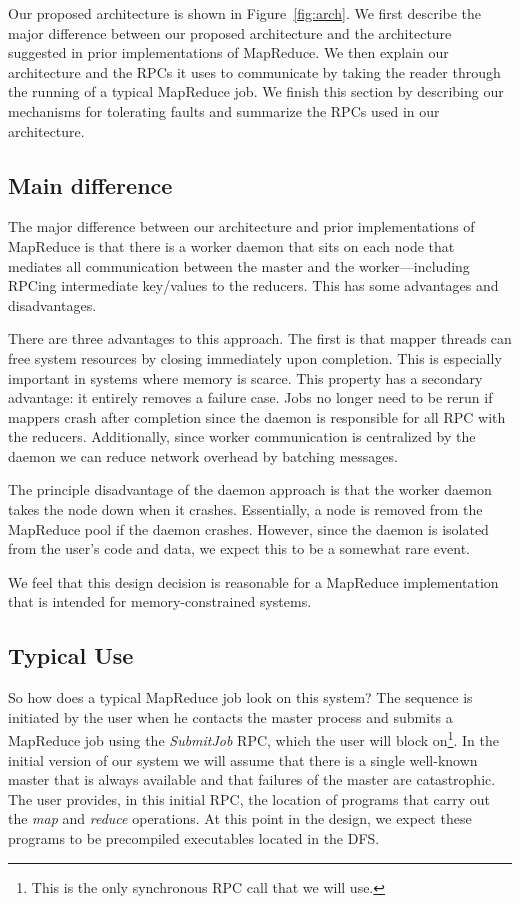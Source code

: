 \documentclass[10pt,letter,final,article,twocolumn]{article} %
\newcommand{\rpc}[1]{\emph{#1}}
\begin{document}
Our proposed architecture is shown in Figure~\ref{fig:arch}. We first describe the major difference between our proposed architecture and the architecture suggested in prior implementations of MapReduce. We then explain our architecture and the RPCs it uses to communicate by taking the reader through the running of a typical MapReduce job. We finish this section by describing our mechanisms for tolerating faults and summarize the RPCs used in our architecture.

\subsection{Main difference}

The major difference between our architecture and prior implementations of MapReduce is that there is a worker daemon that sits on each node that mediates all communication between the master and the worker---including RPCing intermediate key/values to the reducers. This has some advantages and disadvantages.

There are three advantages to this approach. The first is that mapper threads can free system resources by closing immediately upon completion. This is especially important in systems where memory is scarce. This property has a secondary advantage: it entirely removes a failure case. Jobs no longer need to be rerun if mappers crash after completion since the daemon is responsible for all RPC with the reducers. Additionally, since worker communication is centralized by the daemon we can reduce network overhead by batching messages.

The principle disadvantage of the daemon approach is that the worker daemon takes the node down when it crashes.  Essentially, a node is removed from the MapReduce pool if the daemon crashes. However, since the daemon is isolated from the user's code and data, we expect this to be a somewhat rare event.

We feel that this design decision is reasonable for a MapReduce implementation that is intended for memory-constrained systems.

\subsection{Typical Use}

So how does a typical MapReduce job look on this system? The sequence is initiated by the user when he contacts the master process and submits a MapReduce job using the \rpc{SubmitJob} RPC, which the user will block on\footnote{This is the only synchronous RPC call  that we will use.}. In the initial version of our system we will assume that there is a single well-known master that is always available and that failures of the master are catastrophic. The user provides, in this initial RPC, the location of programs that carry out the \emph{map} and \emph{reduce} operations. At this point in the design, we expect these programs to be precompiled executables located in the DFS.
\end{document}
